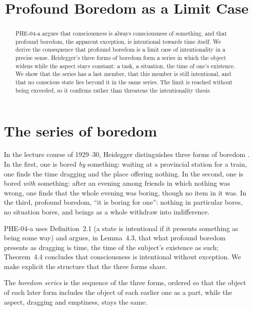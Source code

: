 \documentclass{situationist-preprint}
\title{Profound Boredom as a Limit Case}
\begin{document}
\maketitle

\begin{abstract}
PHE-04-a argues that consciousness is always consciousness of something, and that profound boredom, the apparent exception, is intentional towards time itself. We derive the consequence that profound boredom is a limit case of intentionality in a precise sense. Heidegger's three forms of boredom form a series in which the object widens while the aspect stays constant: a task, a situation, the time of one's existence. We show that the series has a last member, that this member is still intentional, and that no conscious state lies beyond it in the same series. The limit is reached without being exceeded, so it confirms rather than threatens the intentionality thesis.
\end{abstract}

\section{The series of boredom}

In the lecture course of 1929--30, Heidegger distinguishes three forms of boredom \citep{Heidegger1983}. In the first, one is bored \emph{by} something: waiting at a provincial station for a train, one finds the time dragging and the place offering nothing. In the second, one is bored \emph{with} something: after an evening among friends in which nothing was wrong, one finds that the whole evening was boring, though no item in it was. In the third, profound boredom, \enquote{it is boring for one}: nothing in particular bores, no situation bores, and beings as a whole withdraw into indifference.

PHE-04-a uses Definition~2.1 (a state is intentional if it presents something as being some way) and argues, in Lemma~4.3, that what profound boredom presents as dragging is time, the time of the subject's existence as such; Theorem~4.4 concludes that consciousness is intentional without exception. We make explicit the structure that the three forms share.

\begin{definition}\label{d:series}
The \emph{boredom series} is the sequence of the three forms, ordered so that the object of each later form includes the object of each earlier one as a part, while the aspect, dragging and emptiness, stays the same.
\end{definition}
\end{document}
